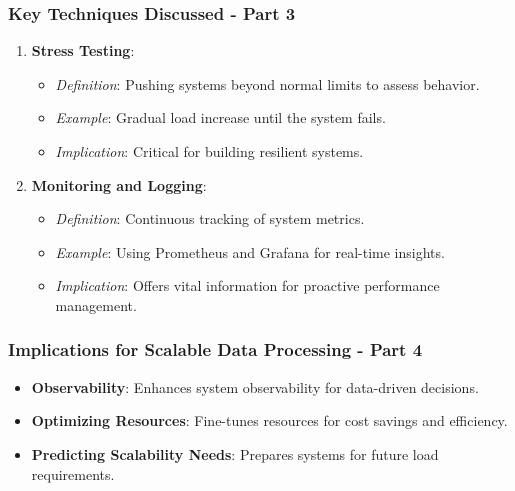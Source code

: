 \documentclass[aspectratio=169]{beamer}
\begin{document}
\begin{frame}[fragile]
  \frametitle{Key Techniques Discussed - Part 3}
  \begin{enumerate}[resume]
    \item \textbf{Stress Testing}:
      \begin{itemize}
        \item \textit{Definition}: Pushing systems beyond normal limits to assess behavior.
        \item \textit{Example}: Gradual load increase until the system fails.
        \item \textit{Implication}: Critical for building resilient systems.
      \end{itemize}
    \item \textbf{Monitoring and Logging}:
      \begin{itemize}
        \item \textit{Definition}: Continuous tracking of system metrics.
        \item \textit{Example}: Using Prometheus and Grafana for real-time insights.
        \item \textit{Implication}: Offers vital information for proactive performance management.
      \end{itemize}
  \end{enumerate}
\end{frame}

\begin{frame}[fragile]
  \frametitle{Implications for Scalable Data Processing - Part 4}
  \begin{itemize}
    \item \textbf{Observability}: Enhances system observability for data-driven decisions.
    \item \textbf{Optimizing Resources}: Fine-tunes resources for cost savings and efficiency.
    \item \textbf{Predicting Scalability Needs}: Prepares systems for future load requirements.
  \end{itemize}
\end{frame}
\end{document}
